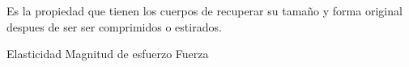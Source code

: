 
\question Es la propiedad que tienen los cuerpos de recuperar su tamaño y
          forma original despues de ser ser comprimidos o estirados.

  \begin{oneparchoices}
    \CorrectChoice Elasticidad
    \choice Magnitud de esfuerzo
    \choice Fuerza
  \end{oneparchoices}

